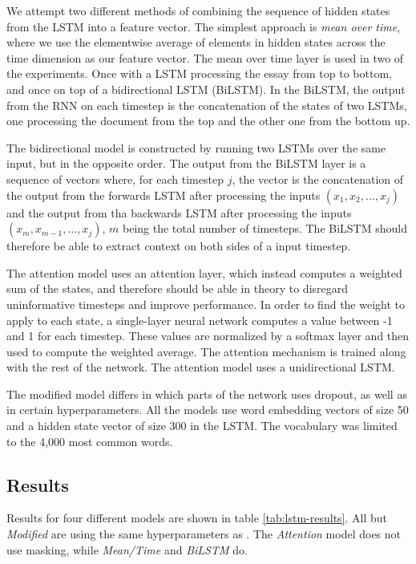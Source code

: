 We attempt two different methods of combining the sequence of hidden states
from the \ac{LSTM} into a feature vector. The simplest approach is \emph{mean
over time}, where we use the elementwise average of elements in hidden states
across the time dimension as our feature vector. The mean over time layer is
used in two of the experiments. Once with a \ac{LSTM} processing the essay
from top to bottom, and once on top of a bidirectional LSTM (BiLSTM). In the
BiLSTM, the output from the \ac{RNN} on each timestep is the concatenation of
the states of two \acp{LSTM}, one processing the document from the top and
the other one from the bottom up.

 The bidirectional model is constructed by
running two \acp{LSTM} over the same input, but in the opposite order. The
output from the BiLSTM layer is a sequence of vectors where, for each
timestep $j$, the vector is the concatenation of the output from the forwards
\ac{LSTM} after processing the inputs $(x_1, x_2, \ldots, x_j)$ and the
output from tha backwards \ac{LSTM} after processing the inputs $(x_m,
x_{m-1}, \ldots, x_j)$, $m$ being the total number of timesteps. The BiLSTM
should therefore be able to extract context on both sides of a input
timestep.


The attention model uses an attention layer, which instead computes a
weighted sum of the states, and therefore should be able in theory to
disregard uninformative timesteps and improve performance. In order to find
the weight to apply to each state, a single-layer neural network computes a
value between -1 and 1 for each timestep. These values are normalized by a
softmax layer and then used to compute the weighted average. The attention
mechanism is trained along with the rest of the network. The attention model
uses a unidirectional \ac{LSTM}.

The modified model differs in which parts of the network uses dropout, as
well as in certain hyperparameters. All the models use word embedding vectors
of size 50 and a hidden state vector of size 300 in the \ac{LSTM}. The
vocabulary was limited to the 4,000 most common words.


\subsection{Results}

Results for four different models are shown in table \ref{tab:lstm-results}. All
but \emph{Modified} are using the same hyperparameters as
\citeauthor{taghipour16}. The \emph{Attention} model does not use masking,
while \emph{Mean/Time} and \emph{BiLSTM} do.


